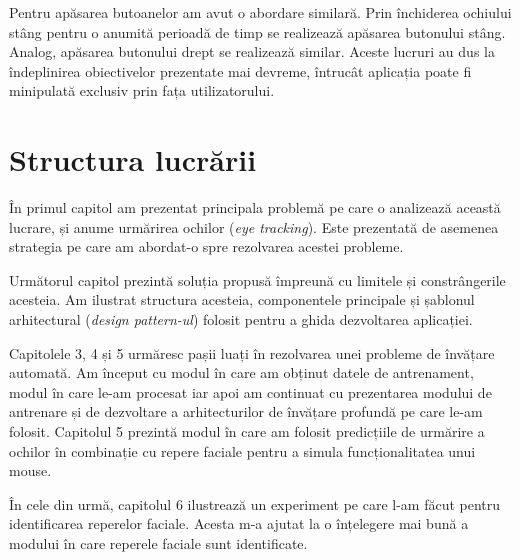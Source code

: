 Pentru apăsarea butoanelor am avut o abordare similară.
Prin închiderea ochiului stâng pentru o anumită perioadă de timp se realizează apăsarea butonului stâng.
Analog, apăsarea butonului drept se realizează similar.
Aceste lucruri au dus la îndeplinirea obiectivelor prezentate mai devreme, întrucât aplicația poate fi minipulată exclusiv prin fața utilizatorului.

\section*{Structura lucrării}
În primul capitol am prezentat principala problemă pe care o analizează această lucrare, și anume urmărirea ochilor (\emph{eye tracking}).
Este prezentată de asemenea strategia pe care am abordat-o spre rezolvarea acestei probleme.

Următorul capitol prezintă soluția propusă împreună cu limitele și constrângerile acesteia.
Am ilustrat structura acesteia, componentele principale și șablonul arhitectural (\emph{design pattern-ul}) folosit pentru a ghida dezvoltarea aplicației.

Capitolele 3, 4 și 5 urmăresc pașii luați în rezolvarea unei probleme de învățare automată.
Am început cu modul în care am obținut datele de antrenament, modul în care le-am procesat iar apoi am continuat cu prezentarea modului de antrenare și de dezvoltare a arhitecturilor de învățare profundă pe care le-am folosit.
Capitolul 5 prezintă modul în care am folosit predicțiile de urmărire a ochilor în combinație cu repere faciale pentru a simula funcționalitatea unui mouse.

În cele din urmă, capitolul 6 ilustrează un experiment pe care l-am făcut pentru identificarea reperelor faciale.
Acesta m-a ajutat la o înțelegere mai bună a modului în care reperele faciale sunt identificate.

